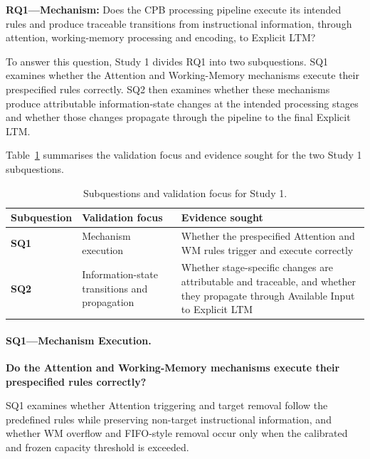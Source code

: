 {\small
\textbf{RQ1---Mechanism:} Does the CPB processing pipeline execute its intended rules and produce traceable transitions from instructional information, through attention, working-memory processing and encoding, to Explicit LTM?
\par}

To answer this question, Study 1 divides RQ1 into two subquestions. SQ1 examines whether the Attention and Working-Memory mechanisms execute their prespecified rules correctly. SQ2 then examines whether these mechanisms produce attributable information-state changes at the intended processing stages and whether those changes propagate through the pipeline to the final Explicit LTM.

Table~\ref{tab:study1-subquestions} summarises the validation focus and evidence sought for the two Study 1 subquestions.

\begin{table}[H]
\centering
\caption{Subquestions and validation focus for Study 1.}
\label{tab:study1-subquestions}
\small
\setlength{\tabcolsep}{4pt}
\renewcommand{\arraystretch}{1.2}
\begin{tabular}{p{} p{} p{}}
\toprule
\textbf{Subquestion} & \textbf{Validation focus} & \textbf{Evidence sought} \\
\midrule
\textbf{SQ1} & Mechanism execution & Whether the prespecified Attention and WM rules trigger and execute correctly \\
\textbf{SQ2} & Information-state transitions and propagation & Whether stage-specific changes are attributable and traceable, and whether they propagate through Available Input to Explicit LTM \\
\bottomrule
\end{tabular}
\end{table}

\paragraph{SQ1---Mechanism Execution.}

{
\textbf{Do the Attention and Working-Memory mechanisms execute their prespecified rules correctly?}
\par}

SQ1 examines whether Attention triggering and target removal follow the predefined rules while preserving non-target instructional information, and whether WM overflow and FIFO-style removal occur only when the calibrated and frozen capacity threshold is exceeded.


